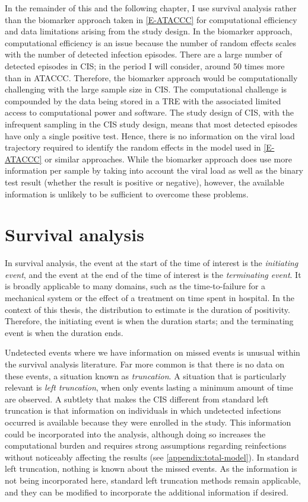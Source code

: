 \documentclass[thesis.tex]{subfiles}
\begin{document}
In the remainder of this and the following chapter, I use survival analysis rather than the biomarker approach taken in \cref{E-ATACCC} for computational efficiency and data limitations arising from the study design.
In the biomarker approach, computational efficiency is an issue because the number of random effects scales with the number of detected infection episodes.
There are a large number of detected episodes in CIS; in the period I will consider, around 50 times more than in ATACCC.
Therefore, the biomarker approach would be computationally challenging with the large sample size in CIS.
The computational challenge is compounded by the data being stored in a TRE with the associated limited access to computational power and software.
The study design of CIS, with the infrequent sampling in the CIS study design, means that most detected episodes have only a single positive test.
Hence, there is no information on the viral load trajectory required to identify the random effects in the model used in \cref{E-ATACCC} or similar approaches.
While the biomarker approach does use more information per sample by taking into account the viral load as well as the binary test result (\ie whether the result is positive or negative), however, the available information is unlikely to be sufficient to overcome these problems.

\section{Survival analysis}

In survival analysis, the event at the start of the time of interest is the \emph{initiating event}, and the event at the end of the time of interest is the \emph{terminating event}.
It is broadly applicable to many domains, such as the time-to-failure for a mechanical system or the effect of a treatment on time spent in hospital.
In the context of this thesis, the distribution to estimate is the duration of positivity.
Therefore, the initiating event is when the duration starts; and the terminating event is when the duration ends.

Undetected events where we have information on missed events is unusual within the survival analysis literature.
Far more common is that there is no data on these events, a situation known as \emph{truncation}.
A situation that is particularly relevant is \emph{left truncation}, when only events lasting a minimum amount of time are observed.
A subtlety that makes the CIS different from standard left truncation is that information on individuals in which undetected infections occurred is available because they were enrolled in the study.
This information could be incorporated into the analysis, although doing so increases the computational burden and requires strong assumptions regarding reinfections without noticeably affecting the results (see \cref{appendix:total-model}).
In standard left truncation, nothing is known about the missed events.
As the information is not being incorporated here, standard left truncation methods remain applicable, and they can be modified to incorporate the additional information if desired.
\end{document}
